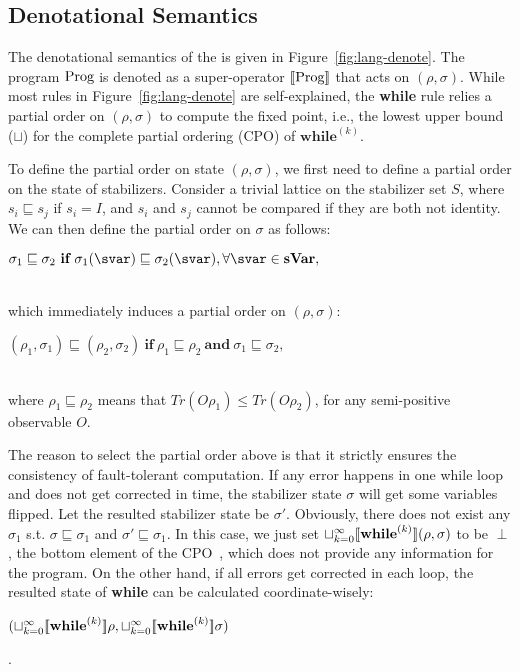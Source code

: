 \subsection{Denotational Semantics}\label{subsect:denotational}
The denotational semantics of the {\langname}  is given in Figure~\ref{fig:lang-denote}. The program $\text{Prog}$ is denoted as a super-operator $[\![ \text{Prog} ]\!]$ that acts on $(\rho, \sigma)$. While most rules in Figure~\ref{fig:lang-denote} are  self-explained, the \textbf{while} rule relies a partial order on $(\rho, \sigma)$ to compute the fixed point, i.e., the lowest upper bound ($\sqcup$) for the complete partial ordering (CPO) of  $\textbf{while}^{(k)}$.

To define the partial order on state $(\rho, \sigma)$, we first need to define a partial order on the state of stabilizers. Consider a trivial lattice on the stabilizer set $S$, where $s_i \sqsubseteq s_j$ if $s_i = I$, and $s_i$ and $s_j$ cannot be compared if they are both not identity. We can then define the partial order on $\sigma$ as follows: \\
\centerline{$\sigma_1 \sqsubseteq \sigma_2 \ \textbf{if}\ \sigma_1(\svar) \sqsubseteq \sigma_2(\svar), \forall \svar \in \textbf{sVar},$} \\
which immediately induces a partial order on $(\rho, \sigma)$: \\
\centerline{
$(\rho_1, \sigma_1) \sqsubseteq (\rho_2, \sigma_2) \ \textbf{if}\ \rho_1 \sqsubseteq \rho_2 \ \textbf{and}\ \sigma_1 \sqsubseteq \sigma_2,$} \\
where $\rho_1 \sqsubseteq \rho_2$ means that $Tr(O\rho_1) \le Tr(O\rho_2)$, for any semi-positive observable $O$. %

The reason to select the partial order above is that it strictly ensures the consistency of fault-tolerant computation. If any error happens in one while loop and does not get corrected in time, the stabilizer state $\sigma$ will get some variables flipped. Let the resulted stabilizer state be $\sigma'$. Obviously, there does not exist any $\sigma_1$ s.t. $\sigma \sqsubseteq \sigma_1$ and $\sigma' \sqsubseteq \sigma_1$. 
In this case, we just set $\sqcup_{k=0}^{\infty} [\![ \textbf{while}^{(k)} ]\!](\rho, \sigma)$ to be $\perp$, the bottom element of the CPO~\cite{Winskel1993TheFS}, which does not provide any information for the program.  On the other hand, if all errors get corrected in each loop, the resulted state of \textbf{while} can be calculated coordinate-wisely: \\
\centerline{$(\sqcup_{k=0}^{\infty} [\![ \textbf{while}^{(k)} ]\!]\rho, \sqcup_{k=0}^{\infty} [\![ \textbf{while}^{(k)} ]\!]\sigma)$}.

